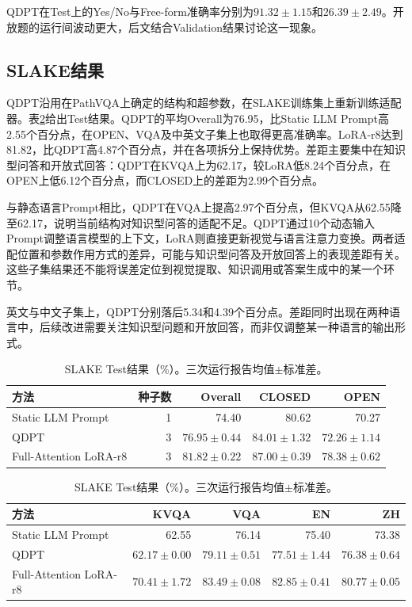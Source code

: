 QDPT在Test上的Yes/No与Free-form准确率分别为$91.32\pm1.15$和$26.39\pm2.49$。开放题的运行间波动更大，后文结合Validation结果讨论这一现象。

\subsection{SLAKE结果}

QDPT沿用在PathVQA上确定的结构和超参数，在SLAKE训练集上重新训练适配器。表\ref{tab:slake-results}给出Test结果。QDPT的平均Overall为76.95，比Static LLM Prompt高2.55个百分点，在OPEN、VQA及中英文子集上也取得更高准确率。LoRA-r8达到81.82，比QDPT高4.87个百分点，并在各项拆分上保持优势。差距主要集中在知识型问答和开放式回答：QDPT在KVQA上为62.17，较LoRA低8.24个百分点，在OPEN上低6.12个百分点，而CLOSED上的差距为2.99个百分点。

与静态语言Prompt相比，QDPT在VQA上提高2.97个百分点，但KVQA从62.55降至62.17，说明当前结构对知识型问答的适配不足。QDPT通过10个动态输入Prompt调整语言模型的上下文，LoRA则直接更新视觉与语言注意力变换。两者适配位置和参数作用方式的差异，可能与知识型问答及开放回答上的表现差距有关。这些子集结果还不能将误差定位到视觉提取、知识调用或答案生成中的某一个环节。

英文与中文子集上，QDPT分别落后5.34和4.39个百分点。差距同时出现在两种语言中，后续改进需要关注知识型问题和开放回答，而非仅调整某一种语言的输出形式。

\begin{table}[t]
    \centering
    \caption{SLAKE Test结果（\%）。三次运行报告均值$\pm$标准差。}
    \label{tab:slake-results}
    \scriptsize
    \begin{tabular}{@{}lrrrr@{}}
        \toprule
        方法 & 种子数 & Overall & CLOSED & OPEN \\
        \midrule
        Static LLM Prompt & 1 & 74.40 & 80.62 & 70.27 \\
        QDPT & 3 & $76.95\pm0.44$ & $84.01\pm1.32$ & $72.26\pm1.14$ \\
        Full-Attention LoRA-r8 & 3 & $81.82\pm0.22$ & $87.00\pm0.39$ & $78.38\pm0.62$ \\
        \bottomrule
    \end{tabular}
    \par\smallskip
    \begin{tabular}{@{}lrrrr@{}}
        \toprule
        方法 & KVQA & VQA & EN & ZH \\
        \midrule
        Static LLM Prompt & 62.55 & 76.14 & 75.40 & 73.38 \\
        QDPT & $62.17\pm0.00$ & $79.11\pm0.51$ & $77.51\pm1.44$ & $76.38\pm0.64$ \\
        Full-Attention LoRA-r8 & $70.41\pm1.72$ & $83.49\pm0.08$ & $82.85\pm0.41$ & $80.77\pm0.05$ \\
        \bottomrule
    \end{tabular}
\end{table}


